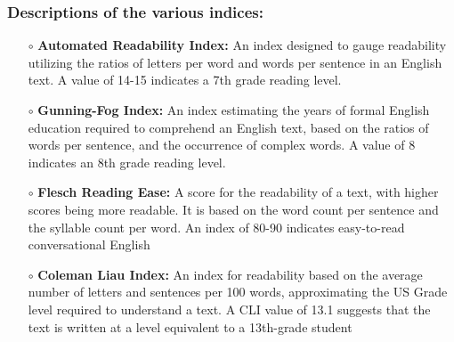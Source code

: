 \documentclass[12pt]{article}
\begin{document}
\subsubsection{Descriptions of the various indices:}
\begin{itemize}
    \item[$\scriptstyle\circ$] \textbf{Automated Readability Index: }An index designed to gauge readability utilizing the ratios of letters per word and words per sentence in an English text. A value of 14-15 indicates a 7th grade reading level. 
    \item[$\scriptstyle\circ$] \textbf{Gunning-Fog Index: }An index estimating the years of formal English education required to comprehend an English text, based on the ratios of words per sentence, and the occurrence of complex words. A value of 8 indicates an 8th grade reading level. 
    \item[$\scriptstyle\circ$] \textbf{Flesch Reading Ease: }A score for the readability of a text, with higher scores being more readable. It is based on the word count per sentence and the syllable count per word. An index of 80-90 indicates easy-to-read conversational English
    \item[$\scriptstyle\circ$] \textbf{Coleman Liau Index: }An index for readability based on the average number of letters and sentences per 100 words, approximating the US Grade level required to understand a text. A CLI value of 13.1 suggests that the text is written at a level equivalent to a 13th-grade student
    
    
\end{itemize}





\printbibliography
\end{document}
